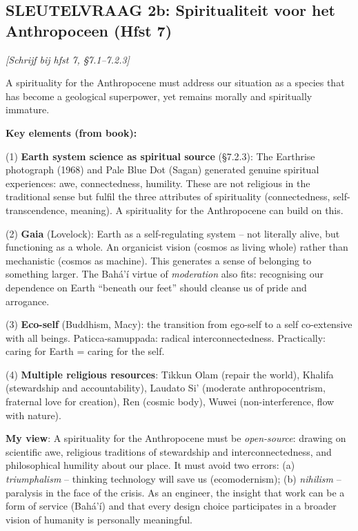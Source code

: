 \documentclass[a4paper,10pt]{article}
\begin{document}
\vspace{3pt}

\begin{answerbox}
\subsection{SLEUTELVRAAG 2b: Spiritualiteit voor het Anthropoceen (Hfst 7)}

\textit{[Schrijf bij hfst 7, §7.1--7.2.3]}

A spirituality for the Anthropocene must address our situation as a species that has become a geological superpower, yet remains morally and spiritually immature.

\textbf{Key elements (from book):}

(1) \textbf{Earth system science as spiritual source} (§7.2.3): The Earthrise photograph (1968) and Pale Blue Dot (Sagan) generated genuine spiritual experiences: awe, connectedness, humility. These are not religious in the traditional sense but fulfil the three attributes of spirituality (connectedness, self-transcendence, meaning). A spirituality for the Anthropocene can build on this.

(2) \textbf{Gaia} (Lovelock): Earth as a self-regulating system -- not literally alive, but functioning as a whole. An organicist vision (cosmos as living whole) rather than mechanistic (cosmos as machine). This generates a sense of belonging to something larger. The Bah\'a'\'i virtue of \textit{moderation} also fits: recognising our dependence on Earth ``beneath our feet'' should cleanse us of pride and arrogance.

(3) \textbf{Eco-self} (Buddhism, Macy): the transition from ego-self to a self co-extensive with all beings. Paticca-samuppada: radical interconnectedness. Practically: caring for Earth = caring for the self.

(4) \textbf{Multiple religious resources}: Tikkun Olam (repair the world), Khalifa (stewardship and accountability), Laudato Si' (moderate anthropocentrism, fraternal love for creation), Ren (cosmic body), Wuwei (non-interference, flow with nature).

\textbf{My view}: A spirituality for the Anthropocene must be \textit{open-source}: drawing on scientific awe, religious traditions of stewardship and interconnectedness, and philosophical humility about our place. It must avoid two errors: (a) \textit{triumphalism} -- thinking technology will save us (ecomodernism); (b) \textit{nihilism} -- paralysis in the face of the crisis. As an engineer, the insight that work can be a form of service (Bah\'a'\'i) and that every design choice participates in a broader vision of humanity is personally meaningful.
\end{answerbox}
\end{document}
